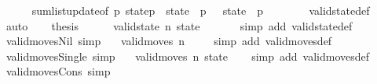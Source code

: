 \begin{isabellebody}
\ \ \ \ \isamarkupfalse%
\ sum{\isacharunderscore}list{\isacharunderscore}update{\isacharbrackleft}of\ p{}\ {\isachardoublequoteopen}state{\isacharbrackleft}p{}\ {\isacharcolon}{\isacharequal}\ state\ {\isacharbang}\ p{}\ {\isacharminus}\ {}{\isacharbrackright}{\isachardoublequoteclose}\ {\isachardoublequoteopen}state\ {\isacharbang}\ p{}\ {\isacharplus}\ {}{\isachardoublequoteclose}{\isacharbrackright}\isanewline
\ \ \ \ \isamarkupfalse%
\ valid{\isacharunderscore}state{\isacharunderscore}def\isanewline
\ \ \ \ \isamarkupfalse%
\ auto\isanewline
\ \ \isamarkupfalse%
\ {\isacharquery}thesis\isanewline
\ \ \ \ \isamarkupfalse%
\ {\isacharbackquoteopen}valid{\isacharunderscore}state\ n\ state{\isacharbackquoteclose}\ {\isacharasterisk}\isanewline
\ \ \ \ \isamarkupfalse%
\ {\isacharparenleft}simp\ add{\isacharcolon}\ valid{\isacharunderscore}state{\isacharunderscore}def{\isacharparenright}\isanewline
{}\isamarkupfalse%
%
\endisatagproof
{\isafoldproof}%
%
\isadelimproof
\isanewline
%
\endisadelimproof
\isanewline
{}\isamarkupfalse%
\ valid{\isacharunderscore}moves{\isacharunderscore}Nil\ {\isacharbrackleft}simp{\isacharbrackright}{\isacharcolon}\isanewline
\ \ \ {\isachardoublequoteopen}valid{\isacharunderscore}moves\ n\ {\isacharbrackleft}{\isacharbrackright}{\isachardoublequoteclose}\isanewline
%
\isadelimproof
\ \ %
\endisadelimproof
%
\isatagproof
{}\isamarkupfalse%
\ {\isacharparenleft}simp\ add{\isacharcolon}\ valid{\isacharunderscore}moves{\isacharunderscore}def{\isacharparenright}%
\endisatagproof
{\isafoldproof}%
%
\isadelimproof
\isanewline
%
\endisadelimproof
\isanewline
{}\isamarkupfalse%
\ valid{\isacharunderscore}moves{\isacharunderscore}Single\ {\isacharbrackleft}simp{\isacharbrackright}{\isacharcolon}\isanewline
\ \ \ {\isachardoublequoteopen}valid{\isacharunderscore}moves\ n\ {\isacharbrackleft}state{\isacharbrackright}{\isachardoublequoteclose}\isanewline
%
\isadelimproof
\ \ %
\endisadelimproof
%
\isatagproof
{}\isamarkupfalse%
\ {\isacharparenleft}simp\ add{\isacharcolon}\ valid{\isacharunderscore}moves{\isacharunderscore}def{\isacharparenright}%
\endisatagproof
{\isafoldproof}%
%
\isadelimproof
\isanewline
%
\endisadelimproof
\isanewline
{}\isamarkupfalse%
\ valid{\isacharunderscore}moves{\isacharunderscore}Cons\ {\isacharbrackleft}simp{\isacharbrackright}{\isacharcolon}\isanewline

\end{isabellebody}

